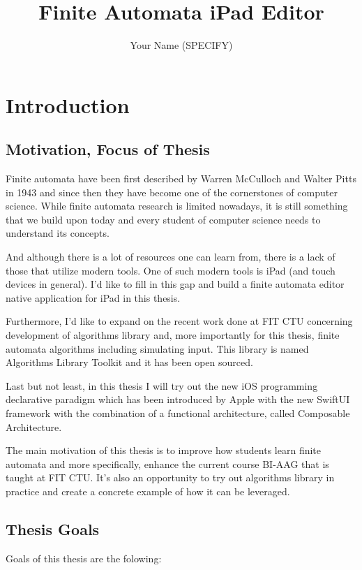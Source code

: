 \documentclass[thesis=B,english]{FITthesis}[2019/12/23]
\title{Finite Automata iPad Editor}
\author{Your Name (SPECIFY)} %
\begin{document}

\chapter{Introduction}

\section{Motivation, Focus of Thesis}

Finite automata have been first described by Warren McCulloch and Walter Pitts in 1943 and since then they have become one of the cornerstones of computer science. While finite automata research is limited nowadays, it is still something that we build upon today and every student of computer science needs to understand its concepts.

And although there is a lot of resources one can learn from, there is a lack of those that utilize modern tools. One of such modern tools is iPad (and touch devices in general). I'd like to fill in this gap and build a finite automata editor native application for iPad in this thesis.

Furthermore, I'd like to expand on the recent work done at FIT CTU concerning development of algorithms library and, more importantly for this thesis, finite automata algorithms including simulating input. This library is named Algorithms Library Toolkit and it has been open sourced.

Last but not least, in this thesis I will try out the new iOS programming declarative paradigm which has been introduced by Apple with the new SwiftUI framework with the combination of a functional architecture, called Composable Architecture.

The main motivation of this thesis is to improve how students learn finite automata and more specifically, enhance the current course BI-AAG that is taught at FIT CTU. It's also an opportunity to try out algorithms library in practice and create a concrete example of how it can be leveraged.

\section{Thesis Goals}

Goals of this thesis are the folowing:
\end{document}
